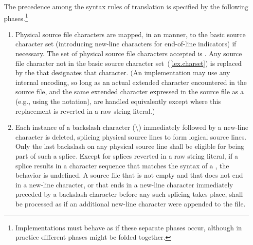 \pnum
{}%
The precedence among the syntax rules of translation is specified by the
following phases.\footnote{Implementations must behave as if these separate phases
occur, although in practice different phases might be folded together.}

\begin{enumerate}
%
%
%
\item Physical source file characters are mapped, in an
 manner,
to the basic source character set (introducing new-line characters for end-of-line
indicators) if necessary.
The set of physical source file characters accepted is .
Any
source file character not in the basic source character
set~(\ref{lex.charset}) is replaced by the
 that
designates that character. (An implementation may use any internal
encoding, so long as an actual extended character encountered in the
source file, and the same extended character expressed in the source
file as a  (e.g., using the  notation), are handled equivalently
except where this replacement is reverted in a raw string literal.)

%
\item Each instance of a backslash character (\textbackslash)
immediately followed by a new-line character is deleted, splicing
physical source lines to form logical source lines. Only the last
backslash on any physical source line shall be eligible for being part
of such a splice.
Except for splices reverted in a raw string literal, if a splice results in
a character sequence that matches the
syntax of a , the behavior is
undefined. A source file that is not empty and that does not end in a new-line
character, or that ends in a new-line character immediately preceded by a
backslash character before any such splicing takes place,
shall be processed as if an additional new-line character were appended
to the file.


\end{enumerate}
